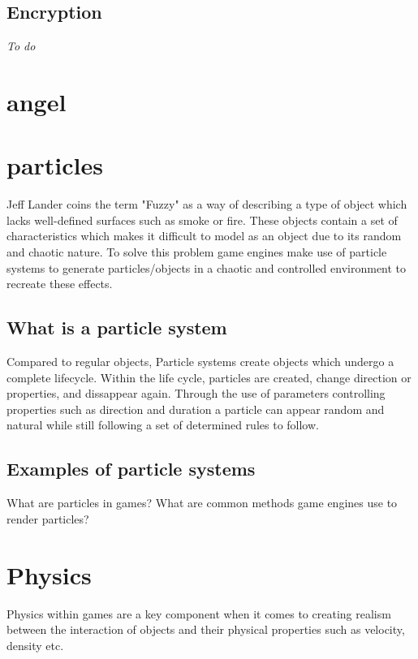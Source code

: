 \documentclass{article} %
\begin{document}
\subsection{Encryption}
\textit{To do}

\newpage

\section{angel}
\section{particles}

Jeff Lander coins the term "Fuzzy" as a way of describing a type of object which lacks well-defined surfaces such as smoke or fire. \cite{Lander_1998} These objects contain a set of characteristics which makes it difficult to model as an object due to its random and chaotic nature. To solve this problem game engines make use of particle systems to generate particles/objects in a chaotic and controlled environment to recreate these effects.

\subsection{What is a particle system}

Compared to regular objects, Particle systems create objects which undergo a complete lifecycle. Within the life cycle, particles are created, change direction or properties, and dissappear again. Through the use of parameters controlling properties such as direction and duration a particle can appear random and natural while still following a set of determined rules to follow.

\subsection{Examples of particle systems}



What are particles in games?
What are common methods game engines use to render particles?

\newpage

\section{Physics}

Physics within games are a key component when it comes to creating realism between the interaction of objects and their physical properties such as velocity, density etc.
\end{document}

